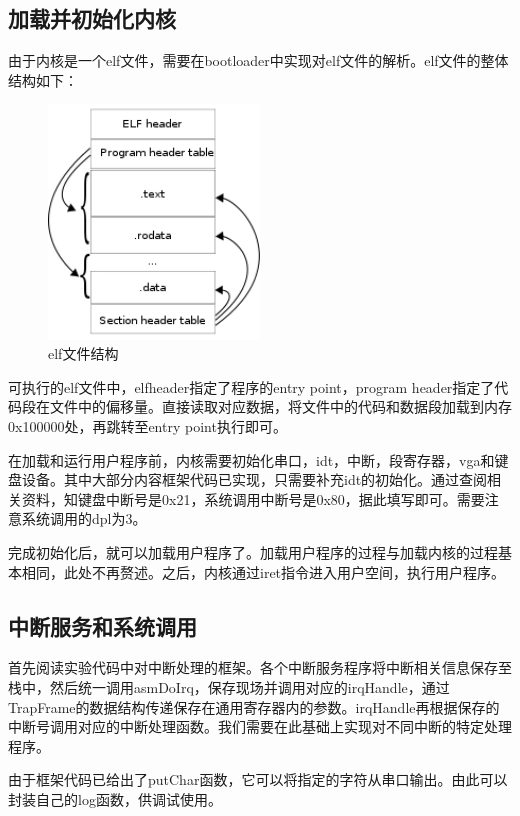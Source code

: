 \documentclass[12pt,a4paper,UTF8]{article}
\begin{document}
\subsection{加载并初始化内核}
由于内核是一个elf文件，需要在bootloader中实现对elf文件的解析。elf文件的整体结构如下：
\begin{figure}[htbp]
	\centering
	\includegraphics[width=0.5\textwidth]{elf}
	\caption{elf文件结构}
\end{figure}
\par 可执行的elf文件中，elfheader指定了程序的entry point，program header指定了代码段在文件中的偏移量。直接读取对应数据，将文件中的代码和数据段加载到内存0x100000处，再跳转至entry point执行即可。
\par 在加载和运行用户程序前，内核需要初始化串口，idt，中断，段寄存器，vga和键盘设备。其中大部分内容框架代码已实现，只需要补充idt的初始化。通过查阅相关资料，知键盘中断号是0x21，系统调用中断号是0x80，据此填写即可。需要注意系统调用的dpl为3。

\par 完成初始化后，就可以加载用户程序了。加载用户程序的过程与加载内核的过程基本相同，此处不再赘述。之后，内核通过iret指令进入用户空间，执行用户程序。

\subsection{中断服务和系统调用}
首先阅读实验代码中对中断处理的框架。各个中断服务程序将中断相关信息保存至栈中，然后统一调用asmDoIrq，保存现场并调用对应的irqHandle，通过TrapFrame的数据结构传递保存在通用寄存器内的参数。irqHandle再根据保存的中断号调用对应的中断处理函数。我们需要在此基础上实现对不同中断的特定处理程序。
\par 由于框架代码已给出了putChar函数，它可以将指定的字符从串口输出。由此可以封装自己的log函数，供调试使用。

\end{document}
